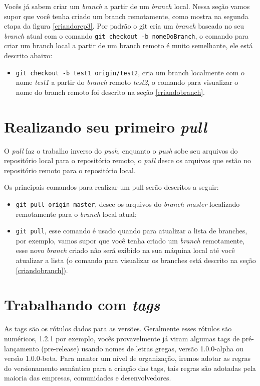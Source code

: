 \documentclass[12pt,openright,oneside,a4paper,english,brazil]{abntex2}
\begin{document}
Vocês já sabem criar um \textit{branch} a partir de um \textit{branch} local. Nessa seção vamos supor que você tenha criado um branch remotamente, como mostra na segunda etapa da figura \ref{criandorep3}. Por padrão o git cria um \textit{branch} baseado no seu \textit{branch} atual com o comando \verb|git checkout -b nomeDoBranch|, o comando para criar um branch local a partir de um branch remoto é muito semelhante, ele está descrito abaixo:

\begin{itemize}
	\item \verb|git checkout -b test1 origin/test2|, cria um branch localmente com o nome \textit{test1} a partir do \textit{branch} remoto \textit{test2}, o comando para visualizar o nome do branch remoto foi descrito na seção \ref{criandobranch}.	
\end{itemize}

\section{Realizando seu primeiro \textit{pull}}

O \textit{pull} faz o trabalho inverso do \textit{push}, enquanto o \textit{push} sobe seu arquivos do repositório local para o repositório remoto, o \textit{pull} desce os arquivos que estão no repositório remoto para o repositório local. 

Os principais comandos para realizar um pull serão descritos a seguir:

\begin{itemize}
	\item \verb|git pull origin master|, desce os arquivos do \textit{branch master} localizado remotamente para o \textit{branch} local atual;
	\item \verb|git pull|, esse comando é usado quando para atualizar a lista de branches, por exemplo, vamos supor que você tenha criado um \textit{branch} remotamente, esse novo \textit{branch} criado não será exibido na sua máquina local até você atualizar a lista (o comando para visualizar os branches está descrito na seção \ref{criandobranch}).
\end{itemize}

\section{Trabalhando com \textit{tags}}

As tags são os rótulos dados para as versões. Geralmente esses rótulos são numéricos, 1.2.1 por exemplo, vocês provavelmente já viram algumas tags de pré-lançamento (pre-release) usando nomes de letras gregas, versão 1.0.0-alpha ou versão 1.0.0-beta. Para manter um nível de organização, iremos adotar as regras do versionamento semântico para a criação das tags, tais regras são adotadas pela maioria das empresas, comunidades e desenvolvedores.
\end{document}
